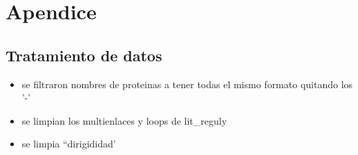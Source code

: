 \section{Apendice}
\subsection{Tratamiento de datos}
\begin{itemize}
    \item se filtraron nombres de proteinas a tener todas el mismo formato quitando los '-'
    \item se limpian los multienlaces y loops de lit\_reguly
    \item se limpia ``dirigididad'

\end{itemize}
